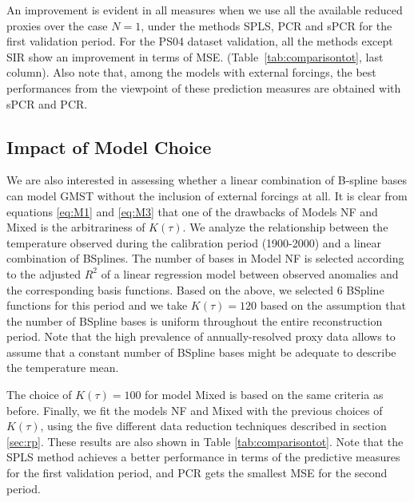 \documentclass[12pt]{amsart}
\theoremstyle{plain}
\theoremstyle{definition}
\theoremstyle{remark}
\newcommand{\lb}[1]{\color{MidnightBlue}\textbf{[LB: #1]}\normalcolor}
\newcommand{\jeg}[1]{\color{ProcessBlue}\textbf{[JEG: #1]}\normalcolor}
\begin{document}
An improvement is evident in all measures when we use all the available reduced proxies over the case
$N=1$, under the methods SPLS, PCR and sPCR for the first validation period.
For the PS04 dataset validation, all the methods except SIR show an improvement in terms of MSE. (Table~\ref{tab:comparisontot}, last column). Also note that, among the models with external forcings, the best performances from the viewpoint of these prediction measures are obtained with sPCR and PCR.

\subsection{Impact of Model Choice}
We are also interested in assessing whether a linear combination of B-spline bases can model GMST without the inclusion of external
forcings at all. It is clear from equations \eqref{eq:M1} and \eqref{eq:M3} that
one of the drawbacks of Models NF and Mixed is the arbitrariness of $K(\tau)$. We analyze the
relationship between the temperature observed during the calibration period
(1900-2000) and a linear combination of BSplines. The number of 
bases in Model NF is selected according to the adjusted $R^2$ of a linear regression model between observed anomalies and
the corresponding basis functions. Based on the above, we selected 6
BSpline functions for this period and we take $K(\tau)=120$ based on the
assumption that the number of BSpline bases is uniform
throughout the entire reconstruction period. Note that the high prevalence of
annually-resolved proxy data allows to assume that a constant number of BSpline bases might be adequate to describe the temperature
mean.%
  
  The choice of $K(\tau)=100$ for model Mixed is
based on the same criteria as before. Finally, we fit the models NF and Mixed
with the previous choices of $K(\tau)$, using the five different data reduction
techniques described in section \ref{sec:rp}. These results are
also shown in Table \ref{tab:comparisontot}. Note that the SPLS method achieves a better performance in terms of the
predictive measures for the first validation period, and PCR gets the smallest
MSE for the second period. 
\end{document}
